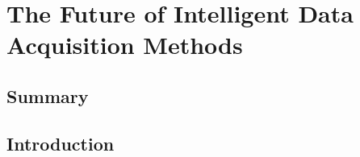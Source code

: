 \chapter{The Future of Intelligent Data Acquisition Methods}

\section{Summary}

\section{Introduction}
